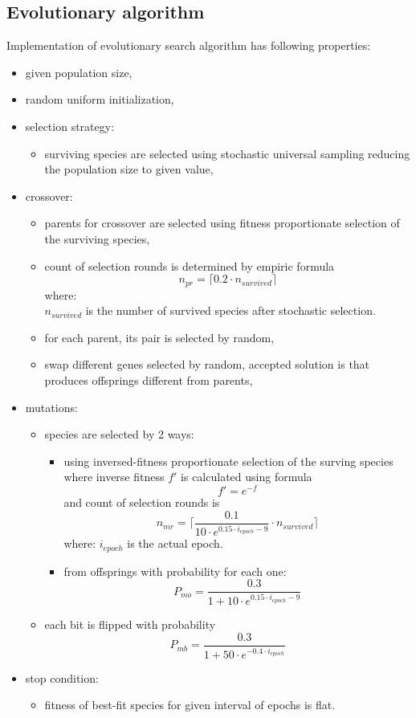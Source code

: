 \documentclass[a4paper,journal]{IEEEtran}
\begin{document}
\subsection{Evolutionary algorithm}
Implementation of evolutionary search algorithm has following properties:
\begin{itemize}
	\item given population size,
	\item random uniform initialization,
	\item selection strategy:
	\begin{itemize}
		\item surviving species are selected using stochastic universal 
		sampling reducing 
		the population size to given value,
	\end{itemize}
	\item crossover:
	\begin{itemize}
		\item parents for crossover are selected using fitness proportionate
		selection of the surviving species,
		\item count of selection rounds is determined by empiric formula
		 \[ n_{pr} = \lceil 0.2\cdot n_{survived} \rceil \] 
		where:\\
		$ n_{survived} $ is the number of survived species after stochastic selection.
		\item for each parent, its pair is selected by random,
		\item swap different genes selected by random, accepted solution is that 
		produces  offsprings different from parents,
	\end{itemize}
	\item mutations:
	\begin{itemize}
		\item species are selected by 2 ways:
		\begin{itemize}
			\item using inversed-fitness proportionate
			selection of the surving species where inverse fitness $ f' $ is 
			calculated using formula \[  f' = e^{-f} \]
			and count of selection rounds is
			\[ n_{mr} = \lceil \dfrac{0.1}{10\cdot e^{0.15\cdot i_{epoch} - 9}} 
			\cdot n_{survived} \rceil \]
			where: $ i_{epoch} $ is the actual epoch.
			\item from offsprings with probability for each one:
			\[ P_{mo} = \dfrac{0.3}{1+10\cdot e^{0.15\cdot i_{epoch} - 9}} \]
		\end{itemize}
		\item each bit is flipped with probability\\
		\[ P_{mb} = \dfrac{0.3}{1+50\cdot e^{-0.4\cdot i_{epoch}}} \]
	\end{itemize}
	\item stop condition:
	\begin{itemize}
		\item fitness of best-fit species for given interval of epochs is flat.
	\end{itemize}
	
\end{itemize}
\end{document}
